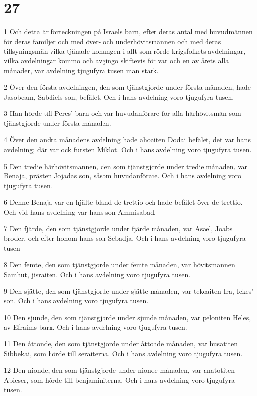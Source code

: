 \chapter{27}

\par 1 Och detta är förteckningen på Israels barn, efter deras antal med huvudmännen för deras familjer och med över- och underhövitsmännen och med deras tillsyningsmän vilka tjänade konungen i allt som rörde krigsfolkets avdelningar, vilka avdelningar kommo och avgingo skiftevis för var och en av årets alla månader, var avdelning tjugufyra tusen man stark.
\par 2 Över den första avdelningen, den som tjänstgjorde under första månaden, hade Jasobeam, Sabdiels son, befälet. Och i hans avdelning voro tjugufyra tusen.
\par 3 Han hörde till Peres' barn och var huvudanförare för alla härhövitsmän som tjänstgjorde under första månaden.
\par 4 Över den andra månadens avdelning hade ahoaiten Dodai befälet, det var hans avdelning; där var ock fursten Miklot. Och i hans avdelning voro tjugufyra tusen.
\par 5 Den tredje härhövitsmannen, den som tjänstgjorde under tredje månaden, var Benaja, prästen Jojadas son, såsom huvudanförare. Och i hans avdelning voro tjugufyra tusen.
\par 6 Denne Benaja var en hjälte bland de trettio och hade befälet över de trettio. Och vid hans avdelning var hans son Ammisabad.
\par 7 Den fjärde, den som tjänstgjorde under fjärde månaden, var Asael, Joabs broder, och efter honom hans son Sebadja. Och i hans avdelning voro tjugufyra tusen
\par 8 Den femte, den som tjänstgjorde under femte månaden, var hövitsmannen Samhut, jisraiten. Och i hans avdelning voro tjugufyra tusen.
\par 9 Den sjätte, den som tjänstgjorde under sjätte månaden, var tekoaiten Ira, Ickes' son. Och i hans avdelning voro tjugufyra tusen.
\par 10 Den sjunde, den som tjänstgjorde under sjunde månaden, var peloniten Heles, av Efraims barn. Och i hans avdelning voro tjugufyra tusen.
\par 11 Den åttonde, den som tjänstgjorde under åttonde månaden, var husatiten Sibbekai, som hörde till seraiterna. Och i hans avdelning voro tjugufyra tusen.
\par 12 Den nionde, den som tjänstgjorde under nionde månaden, var anatotiten Abieser, som hörde till benjaminiterna. Och i hans avdelning voro tjugufyra tusen.
